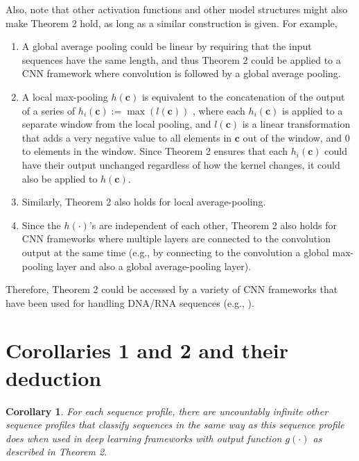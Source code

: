 \documentclass[12pt]{article}
\newcommand{\vect}[1]{\mathbf{#1}}
\newtheorem{corollary}{Corollary}
\begin{document}
Also, note that other activation functions and other model structures might also make Theorem 2 hold, as long as a similar construction is given. For example, 
\begin{enumerate}
\item A global average pooling could be linear by requiring that the input sequences have the same length, and thus Theorem 2 could be applied to a CNN framework where convolution is followed by a global average pooling.
\item A local max-pooling $h(\vect{c})$ is equivalent to the concatenation of the output of a series of $h_i(\vect{c}) := \max(l(\vect{c}))$ , where each $h_i(\vect{c})$ is applied to a separate window from the local pooling, and $l(\vect{c})$ is a linear transformation that adds a very negative value to all elements in $\vect{c}$ out of the window, and 0 to elements in the window. Since Theorem 2 ensures that each $h_i(\vect{c})$ could have their output unchanged regardless of how the kernel changes, it could also be applied to $h(\vect{c})$.
\item Similarly, Theorem 2 also holds for local average-pooling.
\item Since the $h(\cdot)$'s are independent of each other, Theorem 2 also holds for CNN frameworks where multiple layers are connected to the convolution output at the same time (e.g., by connecting to the convolution a global max-pooling layer and also a global average-pooling layer).
\end{enumerate}
Therefore, Theorem 2 could be accessed by a variety of CNN frameworks that have been used for handling DNA/RNA sequences (e.g., \cite{alipanahi_predicting_2015, zhou_predicting_2015, quang_danq:_2016} ).

\section{Corollaries 1 and 2 and their deduction}

\begin{corollary}
For each sequence profile, there are uncountably infinite other sequence profiles that classify sequences in the same way as this sequence profile does when used in deep learning frameworks with output function $g(\cdot)$ as described in Theorem 2.
\end{corollary}
\end{document}
